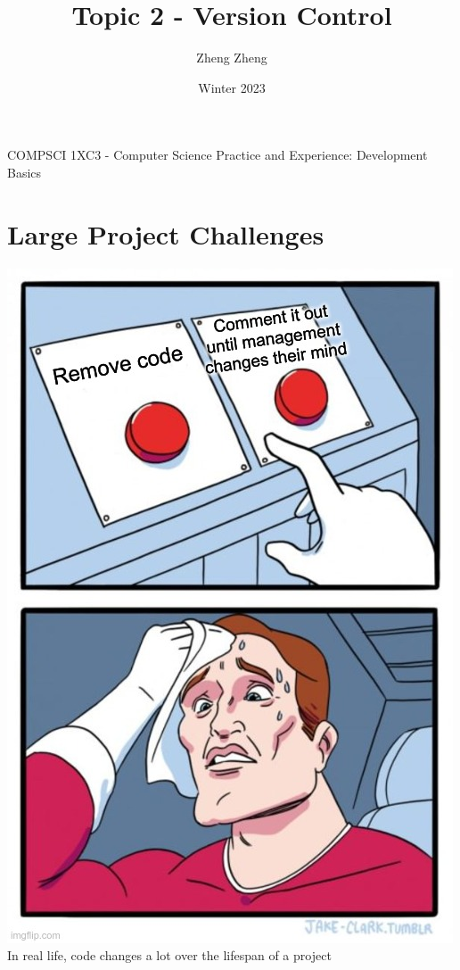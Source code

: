 \documentclass[11pt]{beamer}
\author{Zheng Zheng}
\title{Topic 2 - Version Control}
\institute{McMaster University}
\date{Winter 2023}
\begin{document}
\begin{frame}
\center
COMPSCI 1XC3 - Computer Science Practice and Experience:
Development Basics
\titlepage
\end{frame}

\begin{frame}
\tableofcontents
\end{frame}

\section[Motivation]{Large Project Challenges}
\begin{frame}
\center
\includegraphics[scale=0.24]{meme3.jpeg} \\
In real life, code changes a lot over the lifespan of a project
\end{frame}
\end{document}

